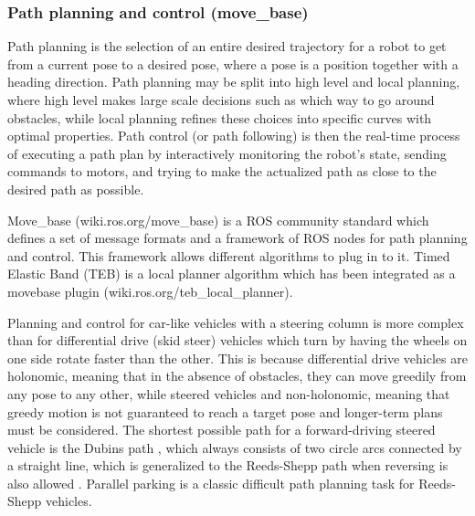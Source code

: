 \documentclass[a4paper]{article}
\begin{document}
\subsubsection{Path planning and control (move\_base)}

Path planning is the selection of an entire desired trajectory for a robot to get from a current pose to a desired pose, where a pose is a position together with a heading direction. Path planning may be split into high level and local planning, where high level makes large scale decisions such as which way to go around obstacles, while local planning refines these choices into specific curves with optimal properties. Path control (or path following) is then the real-time process of executing a path plan by interactively monitoring the robot’s state, sending commands to motors, and trying to make the actualized path as close to the desired path as possible.  

Move\_base (wiki.ros.org/move\_base) is a ROS community standard which defines a set of message formats and a framework of ROS nodes for path planning and control. This framework allows different algorithms to plug in to it. Timed Elastic Band (TEB) \cite{rosmann2013efficient} is a local planner algorithm which has been integrated as a movebase plugin (wiki.ros.org/teb\_local\_planner).

Planning and control for car-like vehicles with a steering column is more complex than for differential drive (skid steer) vehicles which turn by having the wheels on one side rotate faster than the other. This is because differential drive vehicles are holonomic, meaning that in the absence of obstacles, they can move greedily from any pose to any other, while steered vehicles and non-holonomic, meaning that greedy motion is not guaranteed to reach a target pose and longer-term plans must be considered. The shortest possible path for a forward-driving steered vehicle is the Dubins path \cite{dubins1957curves}, which always consists of two circle arcs connected by a straight line, which is generalized to the Reeds-Shepp path when reversing is also allowed \cite{reeds1990optimal}. Parallel parking is a classic difficult path planning task for Reeds-Shepp vehicles.
\end{document}
